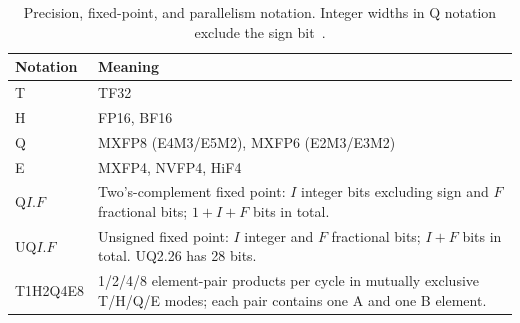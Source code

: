\begin{table}[t]
\centering
\caption{Precision, fixed-point, and parallelism notation. Integer widths in Q notation exclude the sign bit~\cite{ti2003qformat}.}
\label{tab:precision_families}
\begingroup
\footnotesize
\setlength{\tabcolsep}{3pt}
\renewcommand{\arraystretch}{1.0}
\begin{tabular}{@{}p{}p{}@{}}
\toprule
Notation & Meaning \\
\midrule
T & TF32 \\
H & FP16, BF16 \\
Q & MXFP8 (E4M3/E5M2), MXFP6 (E2M3/E3M2) \\
E & MXFP4, NVFP4, HiF4 \\
\midrule
$\mathrm{Q}I.F$ & Two's-complement fixed point: $I$ integer bits excluding sign and $F$ fractional bits; $1+I+F$ bits in total. \\
$\mathrm{UQ}I.F$ & Unsigned fixed point: $I$ integer and $F$ fractional bits; $I+F$ bits in total. UQ2.26 has 28 bits. \\
T1H2Q4E8 & 1/2/4/8 element-pair products per cycle in mutually exclusive T/H/Q/E modes; each pair contains one A and one B element. \\
\bottomrule
\end{tabular}
\endgroup
\end{table}
